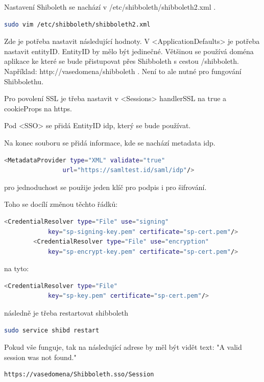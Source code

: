 Nastavení Shiboleth se nachází v /etc/shibboleth/shibboleth2.xml .

\begin{lstlisting}[language=Bash]
   sudo vim /etc/shibboleth/shibboleth2.xml
\end{lstlisting}

Zde je potřeba nastavit následující hodnoty. V <ApplicationDefaults> je potřeba nastavit entityID. EntityID by mělo být jedinečné. Většinou se používá doména aplikace ke které se bude přistupovat přes Shibboleth s cestou /shibboleth. Například: http://vasedomena/shibboleth . Není to ale nutné pro fungování Shibbolethu.

Pro povolení SSL je třeba nastavit v <Sessions>  handlerSSL na true a cookieProps na https.

Pod <SSO> se přidá EntityID idp, který se bude používat.

Na konec souboru se přidá informace, kde se nachází metadata idp.
\begin{lstlisting}[language=Bash]
 <MetadataProvider type="XML" validate="true"
                url="https://samltest.id/saml/idp"/>
\end{lstlisting}

pro jednoduchost se použije jeden klíč pro podpis i pro šifrování.

Toho se docílí změnou těchto řádků:
\begin{lstlisting}[language=Bash]
<CredentialResolver type="File" use="signing"
            key="sp-signing-key.pem" certificate="sp-cert.pem"/>
        <CredentialResolver type="File" use="encryption"
            key="sp-encrypt-key.pem" certificate="sp-cert.pem"/>
\end{lstlisting}

na tyto:
\begin{lstlisting}[language=Bash]
<CredentialResolver type="File"
            key="sp-key.pem" certificate="sp-cert.pem"/>
\end{lstlisting}

následně je třeba restartovat shibboleth
\begin{lstlisting}[language=Bash]
sudo service shibd restart
\end{lstlisting}

Pokud vše funguje, tak na následující adrese by měl být vidět text: "A valid session was not found."
\begin{lstlisting}[language=Bash]
https://vasedomena/Shibboleth.sso/Session
\end{lstlisting}

